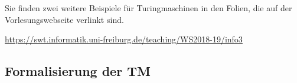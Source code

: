 
{
\color{red}
Sie finden zwei weitere Beispiele für Turingmaschinen in den Folien, die auf der Vorlesungswebseite verlinkt sind.

\url{https://swt.informatik.uni-freiburg.de/teaching/WS2018-19/info3}
}

\subsection{Formalisierung der \acl{TM}}


